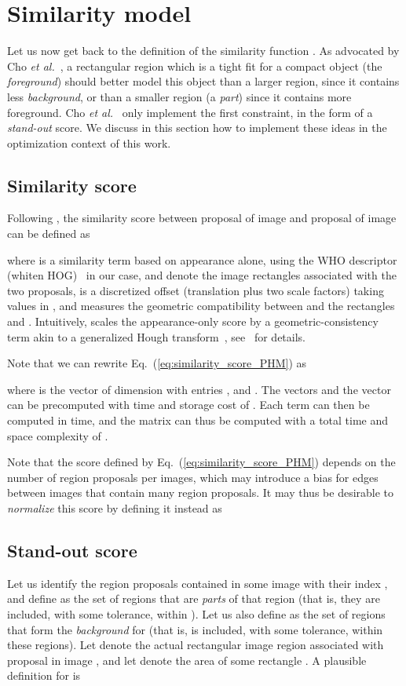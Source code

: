 \documentclass[10pt,twocolumn,letterpaper]{article}
\numberwithin{theorem}{section}
\begin{document}
 
\section{Similarity model\label{sec:similarity_model}}

Let us now get back to the definition of the similarity function
. As advocated by Cho {\em et al.}~\cite{CKSP15}, a
rectangular region which is a tight fit for a compact object (the {\em
  foreground}) should better model this object than a larger region,
since it contains less {\em background}, or than a smaller region (a
{\em part}) since it contains more foreground. Cho {\em et al.}~\cite{CKSP15} only
implement the first constraint, in the form of a {\em stand-out}
score. We discuss in this section how to implement these ideas in the
optimization context of this work.

\subsection{Similarity score}
Following \cite{CKSP15}, the similarity score
between proposal  of image  and proposal  of image
 can be defined as

where  is a similarity term based on appearance alone,
using the WHO descriptor (whiten HOG)~\cite{dalal2005histograms, hariharan2012who} in our case,
 and  denote the image rectangles associated with the
two proposals,  is a discretized offset (translation plus two scale
factors) taking values in , and  measures the geometric
compatibility between  and the rectangles  and .
Intuitively,  scales the appearance-only score
 by a geometric-consistency term akin to a generalized
Hough transform~\cite{Ballard81}, see~\cite{CKSP15} for details.

Note that we can rewrite Eq.~(\ref{eq:similarity_score_PHM}) as

where  is the vector of dimension  with entries
, and .  
The  vectors  and the vector  can be
precomputed with time and storage cost of . Each
term  can then be computed in  time, and
the matrix  can thus be computed with a total time and space
complexity of .

Note that the score  defined by
Eq.~(\ref{eq:similarity_score_PHM}) depends on the number of
region proposals per images, which may introduce a bias for
edges between images that contain many region proposals. It may
thus be desirable to {\em normalize} this score by defining it instead as



\subsection{Stand-out score}
Let us identify the region proposals contained in some image  with
their index , and define  as the set of regions that are
{\em parts} of that region (that is, they are included, with some
tolerance, within ). Let us also define  as the set of
regions that form the {\em background} for  (that is,  is
included, with some tolerance, within these regions). 
Let  denote the actual rectangular image region associated with
proposal  in image , and let  denote the area of some
rectangle . A plausible definition for  is
\end{document}

